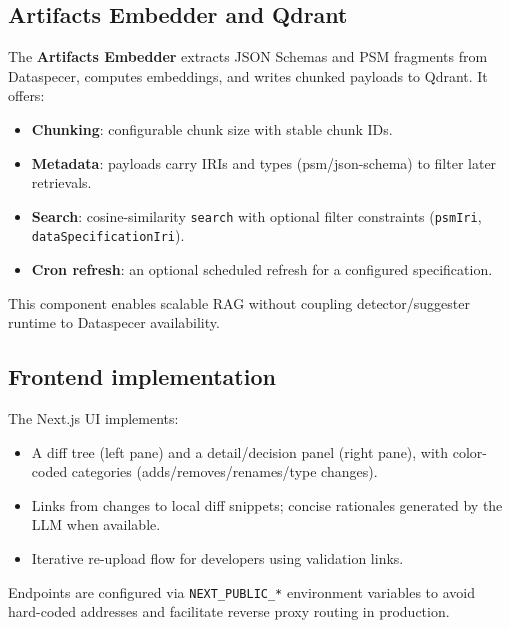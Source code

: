 \subsection{Artifacts Embedder and Qdrant}
The \textbf{Artifacts Embedder} extracts JSON Schemas and PSM fragments from Dataspecer, computes embeddings, and writes chunked payloads to Qdrant. It offers:
\begin{itemize}
  \item \textbf{Chunking}: configurable chunk size with stable chunk IDs.
  \item \textbf{Metadata}: payloads carry IRIs and types (psm/json-schema) to filter later retrievals.
  \item \textbf{Search}: cosine-similarity \texttt{search} with optional filter constraints (\texttt{psmIri}, \texttt{dataSpecificationIri}).
  \item \textbf{Cron refresh}: an optional scheduled refresh for a configured specification.
\end{itemize}
This component enables scalable RAG without coupling detector/suggester runtime to Dataspecer availability.

\subsection{Frontend implementation}
The Next.js UI implements:
\begin{itemize}
  \item A diff tree (left pane) and a detail/decision panel (right pane), with color-coded categories (adds/removes/renames/type changes).
  \item Links from changes to local diff snippets; concise rationales generated by the LLM when available.
  \item Iterative re-upload flow for developers using validation links.
\end{itemize}
Endpoints are configured via \texttt{NEXT\_PUBLIC\_*} environment variables to avoid hard-coded addresses and facilitate reverse proxy routing in production.

